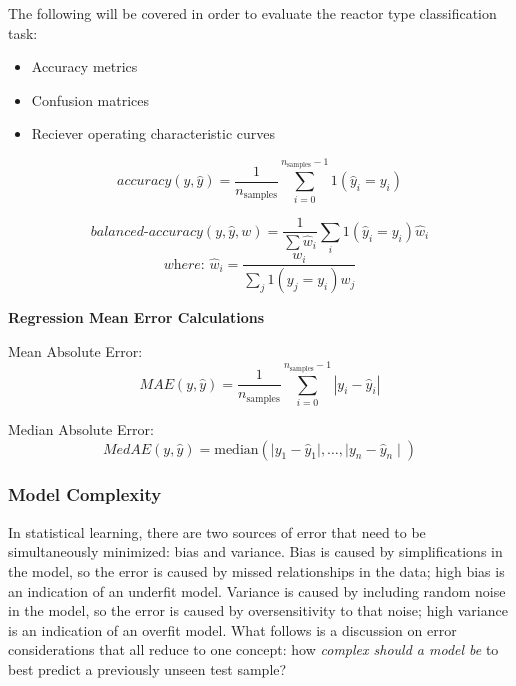 The following will be covered in order to evaluate the reactor type
classification task:
\begin{itemize}
  \item Accuracy metrics
  \item Confusion matrices 
  \item Reciever operating characteristic curves
\end{itemize}

\begin{equation}
  \textit{accuracy}(y, \hat{y}) = \frac{1}{n_\text{samples}} \sum_{i=0}^{n_\text{samples}-1} 1(\hat{y}_i = y_i)
\end{equation}

\begin{equation}
  \textit{balanced-accuracy}(y, \hat{y}, w) = \frac{1}{\sum{\hat{w}_i}} \sum_i 1(\hat{y}_i = y_i) \hat{w}_i
\end{equation}
\[ \textit{where: } \hat{w}_i = \frac{w_i}{\sum_j{1(y_j = y_i) w_j}} \]

\noindent \textbf{Regression Mean Error Calculations}

Mean Absolute Error:
\begin{equation}
  \textit{MAE}(y, \hat{y}) = \frac{1}{n_{\text{samples}}} \sum_{i=0}^{n_{\text{samples}}-1} \left| y_i - \hat{y}_i \right|
\end{equation}

Median Absolute Error:
\begin{equation}
  \textit{MedAE}(y, \hat{y}) = \text{median}(\mid y_1 - \hat{y}_1 \mid, \ldots, \mid y_n - \hat{y}_n \mid)
\end{equation}


\subsubsection{Model Complexity}
\label{sec:complexity}

In statistical learning, there are two sources of error that need to be
simultaneously minimized: bias and variance. Bias is caused by simplifications
in the model, so the error is caused by missed relationships in the data; high
bias is an indication of an underfit model.  Variance is caused by including
random noise in the model, so the error is caused by oversensitivity to that
noise; high variance is an indication of an overfit model. What follows is a
discussion on error considerations that all reduce to one concept: how
\textit{complex should a model be} to best predict a previously unseen test
sample?

